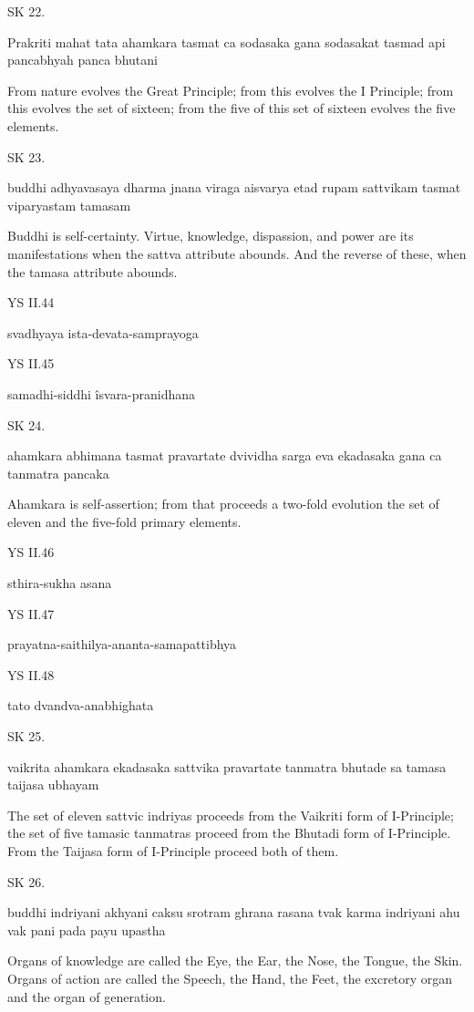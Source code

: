 SK 22.

Prakriti mahat tata ahamkara tasmat ca sodasaka gana
sodasakat tasmad api pancabhyah panca bhutani

From nature evolves the Great Principle;
from this evolves the I Principle;
from this evolves the set of sixteen;
from the five of this set of sixteen evolves the five elements.

SK 23.

buddhi adhyavasaya dharma jnana viraga aisvarya
etad rupam sattvikam tasmat viparyastam tamasam

Buddhi is self-certainty.
Virtue, knowledge, dispassion, and power are its manifestations
when the sattva attribute abounds.
And the reverse of these, when the tamasa attribute abounds.

YS II.44

svadhyaya ista-devata-samprayoga

YS II.45

samadhi-siddhi îsvara-pranidhana

SK 24.

ahamkara abhimana tasmat pravartate dvividha sarga eva
ekadasaka gana ca tanmatra pancaka

Ahamkara is self-assertion;
from that proceeds a two-fold evolution
the set of eleven and the five-fold primary elements.

YS II.46

sthira-sukha asana

YS II.47

prayatna-saithilya-ananta-samapattibhya

YS II.48

tato dvandva-anabhighata

SK 25.

vaikrita ahamkara ekadasaka sattvika pravartate
tanmatra bhutade sa tamasa taijasa ubhayam

The set of eleven sattvic indriyas proceeds
from the Vaikriti form of I-Principle;
the set of five tamasic tanmatras proceed
from the Bhutadi form of I-Principle.
From the Taijasa form of I-Principle proceed both of them.

SK 26.

buddhi indriyani akhyani caksu srotram ghrana rasana tvak
karma indriyani ahu vak pani pada payu upastha

Organs of knowledge are called
the Eye, the Ear, the Nose, the Tongue, the Skin.
Organs of action are called
the Speech, the Hand, the Feet, the excretory organ and the organ of generation.

